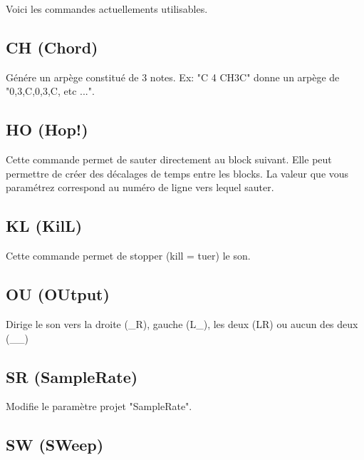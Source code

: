 
Voici les commandes actuellements utilisables.

\subsection{CH (Chord)}


Génére un arpège constitué de 3 notes. Ex: "C 4 CH3C" donne un arpège de "0,3,C,0,3,C, etc ...".

\subsection{HO (Hop!)}

Cette commande permet de sauter directement au block suivant.
Elle peut permettre de créer des décalages de temps entre les blocks.
La valeur que vous paramétrez correspond au numéro de ligne vers lequel sauter.

\subsection{KL (KilL)}

Cette commande permet de stopper (kill = tuer) le son.


\subsection{OU (OUtput)}

Dirige le son vers la droite (\_R), gauche (L\_), les deux (LR) ou aucun des deux (\_\_)

\subsection{SR (SampleRate)}

Modifie le paramètre projet "SampleRate".

\subsection{SW (SWeep)}

